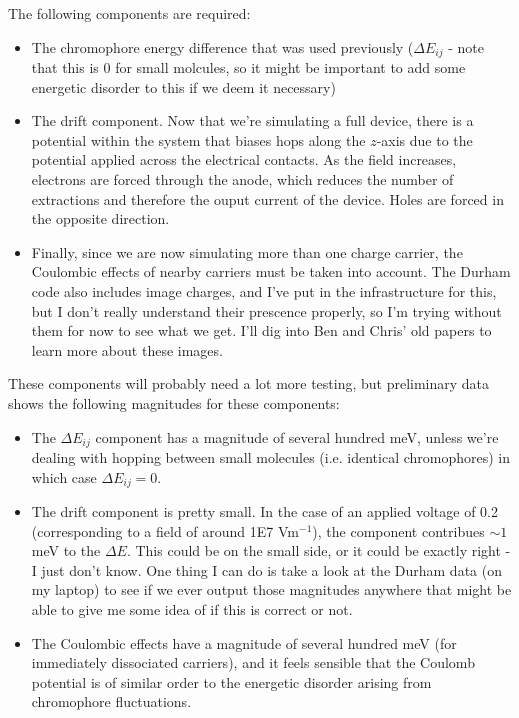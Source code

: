 \documentclass[12pt]{article}
\begin{document}
The following components are required:

\begin{itemize}
\item{The chromophore energy difference that was used previously ($\Delta E_{ij}$ - note that this is 0 for small molcules, so it might be important to add some energetic disorder to this if we deem it necessary)}
\item{The drift component.
        Now that we're simulating a full device, there is a potential within the system that biases hops along the $z$-axis due to the potential applied across the electrical contacts.
        As the field increases, electrons are forced through the anode, which reduces the number of extractions and therefore the ouput current of the device.
    Holes are forced in the opposite direction.}
\item{Finally, since we are now simulating more than one charge carrier, the Coulombic effects of nearby carriers must be taken into account.
    The Durham code also includes image charges, and I've put in the infrastructure for this, but I don't really understand their prescence properly, so I'm trying without them for now to see what we get.
    I'll dig into Ben and Chris' old papers to learn more about these images.}
\end{itemize}

These components will probably need a lot more testing, but preliminary data shows the following magnitudes for these components:

\begin{itemize}
    \item{The $\Delta E_{ij}$ component has a magnitude of several hundred meV, unless we're dealing with hopping between small molecules (i.e. identical chromophores) in which case $\Delta E_{ij} = 0$.}
    \item{The drift component is pretty small. In the case of an applied voltage of 0.2 (corresponding to a field of around 1E7 Vm$^{-1}$), the component contribues $\sim 1$ meV to the $\Delta E$.
        This could be on the small side, or it could be exactly right - I just don't know.
        One thing I can do is take a look at the Durham data (on my laptop) to see if we ever output those magnitudes anywhere that might be able to give me some idea of if this is correct or not.}
    \item{The Coulombic effects have a magnitude of several hundred meV (for immediately dissociated carriers), and it feels sensible that the Coulomb potential is of similar order to the energetic disorder arising from chromophore fluctuations.}
\end{itemize}



\end{document}
